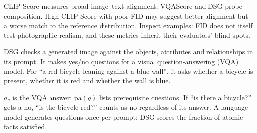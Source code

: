 \metricsecondary

CLIP Score measures broad image--text alignment; VQAScore and DSG probe composition. High CLIP Score with poor FID may suggest better alignment but a worse match to the reference distribution. Inspect examples: FID does not itself test photographic realism, and these metrics inherit their evaluators' blind spots.

\metricend
\clearpage
\thispagestyle{genaistyle}
\label{sec:dsg}


DSG checks a generated image against the objects, attributes and relationships in its prompt. It makes yes/no questions for a visual question-answering (VQA) model. For ``a red bicycle leaning against a blue wall'', it asks whether a bicycle is present, whether it is red and whether the wall is blue.

\begin{metricformula}
\end{metricformula}

$a_q$ is the VQA answer; $\text{pa}(q)$ lists prerequisite questions. If ``is there a bicycle?'' gets a no, ``is the bicycle red?'' counts as no regardless of its answer. A language model generates questions once per prompt; DSG scores the fraction of atomic facts satisfied.


